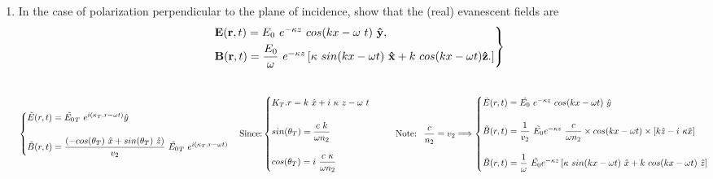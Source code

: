\documentclass[fleqn]{article}
\begin{document}
\begin{enumerate}
\begin{enumerate}
      \item In the case of polarization perpendicular to the plane of incidence, show that
      the (real) evanescent fields are
      $$
        \begin{rcases*}
          \mathbf{E(r},t)=E_0 ~ e^{-\kappa z} ~ cos(kx-\omega ~ t) ~ \mathbf{\hat{y}},
          \\
          \mathbf{B(r},t)=\dfrac{E_0}{\omega} ~ e^{-\kappa z} \left[
            \kappa ~ sin(kx-\omega t) ~ \mathbf{\hat{x}}+k ~ cos(kx-\omega t) \mathbf{\hat{z}}.
          \right]
        \end{rcases*}
      $$

        \textcolor{hwColor}{
          \\
          $
            \begin{cases}
              \tilde{E}(r,t)=\tilde{E_0}_T ~ e^{i(\kappa_T.r-\omega t)} \hat{y}
              \\
              \\
              \tilde{B}(r,t)=\dfrac{\left(-cos(\theta_T) ~ \hat{x}+sin(\theta_T) ~ \hat{z}\right)}{v_2} ~ \tilde{E_0}_T ~ e^{i(\kappa_T.r-\omega t)} 
            \end{cases}
            \\
            \\
            \\
            \text{Since:}
            \\
            \\
            \begin{cases}
              K_T.r=k ~ \hat{x}+i ~ \kappa ~ z-\omega ~ t 
              \\
              \\
              sin(\theta_T)=\dfrac{c ~ k}{\omega n_2}
              \\
              \\
              cos(\theta_T)=i ~ \dfrac{c ~ \kappa}{\omega n_2}
            \end{cases} ~~~~~ \text{Note: ~} \dfrac{c}{n_2}=v_2
            \\
            \\
            \\
            \Longrightarrow
            \begin{cases}
              \tilde{E}(r,t)=\tilde{E_0} ~ e^{-\kappa z} ~ cos(kx-\omega t) ~ \hat{y}
              \\
              \\
              \tilde{B}(r,t)=\dfrac{1}{v_2} ~ \tilde{E_0} e^{-\kappa z} ~ \dfrac{c}{\omega n_2} \times cos(kx-\omega t) \times \left[k \hat{z}-i ~ \kappa \hat{x}\right]
              \\
              \\
              \tilde{B}(r,t)=\dfrac{1}{\omega} ~ \tilde{E_0} e^{-\kappa z} \left[
                \kappa ~ sin(kx-\omega t) ~ \hat{x}+k ~ cos(kx-\omega t) ~ \hat{z}
              \right] 
            \end{cases} 
          $
        }


\end{enumerate}
\end{enumerate}
\end{document}
